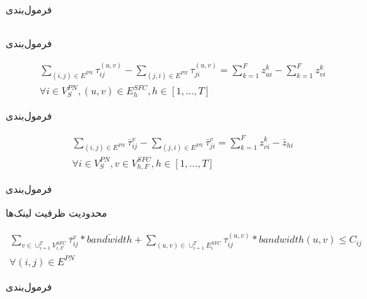 \documentclass{beamer}
\begin{document}
\begin{persian}
\begin{frame}{فرمول‌بندی}
\begin{latin}
\begin{tabular}{c p{10cm}}
    \end{tabular}\end{latin}
\end{frame}
\begin{frame}{فرمول‌بندی} %
    \par
    \begin{latin}\begin{align}
        \sum_{(i,j) \in E^{PN}} \tau_{ij}^{(u,v)} - \sum_{(j,i) \in E^{PN}} \tau_{ji}^{(u,v)} = \sum_{k=1}^{F} z_{ui}^{k} - \sum_{k=1}^{F} z_{vi}^{k} \nonumber \\
        \forall i \in V_{S}^{PN}, (u,v) \in E_{h}^{SFC}, h \in [1,\ldots, T]
    \end{align}\end{latin}
\end{frame}
\begin{frame}{فرمول‌بندی} %
    \par
    \begin{latin}\begin{align}
        \sum_{(i,j) \in E^{PN}} \bar{\tau}_{ij}^{v} - \sum_{(j,i) \in E^{PN}} \bar{\tau}_{ji}^{v} = \sum_{k=1}^{F} z_{vi}^{k} - \bar{z}_{hi} \nonumber \\
        \forall i \in V_{S}^{PN}, v \in V_{h, F}^{SFC}, h \in [1,\ldots, T]
    \end{align}\end{latin}
\end{frame}
\begin{frame}{فرمول‌بندی} %
    \par
    محدودیت ظرفیت لینک‌ها
    \begin{latin}\begin{align}
        \sum_{v \in \cup_{i=1}^{T} V_{i,F}^{SFC}} \bar{\tau}_{ij}^{v} * \bar{bandwidth} + \sum_{(u,v) \in \cup_{i=1}^{T} E_{i}^{SFC}} \tau_{ij}^{(u,v)} * bandwidth(u,v) \le C_{ij} \nonumber \\
        \forall (i, j) \in E^{PN}
    \end{align}\end{latin}
\end{frame}
\begin{frame}{فرمول‌بندی} %

\end{frame}
\end{persian}
\end{document}
